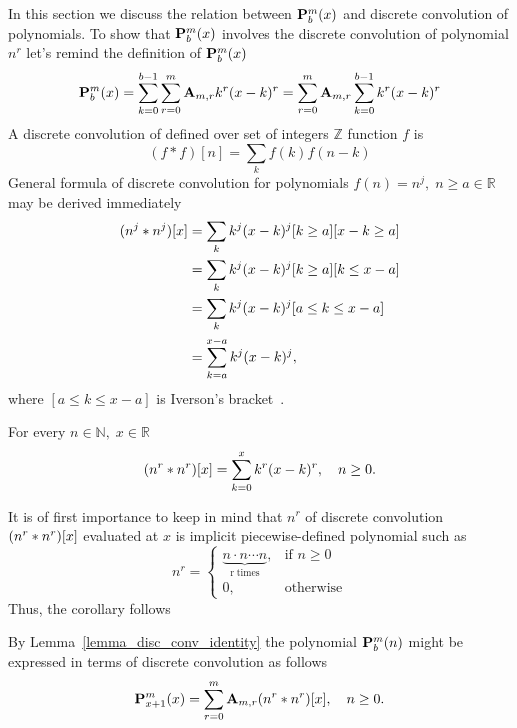 In this section we discuss the relation between ${\mathbf{P}}\sp{m} \sb{b}(x)$ and discrete convolution of
polynomials.
To show that ${\mathbf{P}}\sp{m} \sb{b}(x)$ involves the discrete convolution of polynomial $n^r$
let's remind the definition of ${\mathbf{P}}\sp{m} \sb{b}(x)$
\begin{equation*}
    {\mathbf{P}}\sp{m} \sb{b}(x) = \sum_{k=0}^{b-1} \sum_{r=0}^{m} {\mathbf{A}} \sb{m,r} k^r (x-k)^r
    = \sum_{r=0}^{m} {\mathbf{A}} \sb{m,r} \sum_{k=0}^{b-1} k^r (x-k)^r
\end{equation*}
A discrete convolution of defined over set of integers $\mathbb{Z}$ function $f$ is
\begin{equation*}
(f \ast f)[n]
    = \sum_{k} f(k) f(n-k)
\end{equation*}
General formula of discrete convolution for polynomials $f(n) = n^j, \; n\geq a \in \mathbb{R}$ may be derived immediately
\begin{equation*}
    \begin{split}
        (n \sp{j} \ast n \sp{j}) [x]
        &=\sum_{k} k^j (x-k)^j [k\geq a][x-k\geq a] \\
        &=\sum_{k} k^j (x-k)^j [k\geq a][k\leq x-a] \\
        &=\sum_{k} k^j (x-k)^j [a \leq k \leq x-a] \\
        &=\sum_{k=a}^{x-a} k^j (x-k)^j,
    \end{split}
\end{equation*}
where $[a \leq k \leq x-a]$ is Iverson's bracket~\cite{APL}.
\begin{lem}
    \label{lemma_disc_conv_identity}
    For every $n\in\mathbb{N}, \; x\in\mathbb{R}$
    \[
        (n \sp{r} \ast n \sp{r}) [x] = \sum_{k=0}^{x} k^r (x-k)^r, \quad n\geq 0.
    \]
\end{lem}
It is of first importance to keep in mind that  $n^r$ of discrete convolution $(n \sp{r} \ast n \sp{r}) [x]$ evaluated at $x$
is implicit piecewise-defined polynomial such as
\begin{equation*}
    n^{r} =
    \begin{cases}
        \underbrace{n \cdot n \cdots n}_{\mathrm{r \; times}}, & \mbox{if } n \geq 0 \\
        0, & \mbox{otherwise}
    \end{cases}
\end{equation*}
Thus, the corollary follows
\begin{cor}
    \label{cor_polynomial_p_and_macaulay_convolution}
    By Lemma~\ref{lemma_disc_conv_identity} the polynomial ${\mathbf{P}}\sp{m} \sb{b}(n)$ might be expressed in terms
    of discrete convolution as follows
    \[
        {\mathbf{P}}\sp{m} \sb{x+1}(x) = \sum_{r=0}^{m} {\mathbf{A}} \sb{m,r} (n \sp{r} \ast n \sp{r}) [x], \quad n\geq 0.
    \]
\end{cor}
